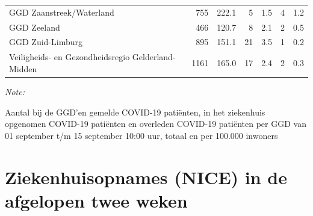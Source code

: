 \documentclass[
  english,
  man,floatsintext]{apa6}
\begin{document}
\begin{table}
\begin{threeparttable}
\begin{tabular}{lrrrrrr}
GGD Zaanstreek/Waterland & 755 & 222.1 & 5 & 1.5 & 4 & 1.2\\
GGD Zeeland & 466 & 120.7 & 8 & 2.1 & 2 & 0.5\\
GGD Zuid-Limburg & 895 & 151.1 & 21 & 3.5 & 1 & 0.2\\
Veiligheids- en Gezondheidsregio Gelderland-Midden & 1161 & 165.0 & 17 & 2.4 & 2 & 0.3\\
\bottomrule
\end{tabular}
\begin{tablenotes}
\item \textit{Note: } 
\item Aantal bij de GGD’en gemelde COVID-19 patiënten, in het ziekenhuis opgenomen COVID-19 patiënten en overleden COVID-19 patiënten per GGD van 01 september t/m 15 september 10:00 uur, totaal en per 100.000 inwoners
\end{tablenotes}
\end{threeparttable}
\endgroup{}
\end{table}

\newpage

\hypertarget{ziekenhuisopnames-nice-in-de-afgelopen-twee-weken}{%
\section{Ziekenhuisopnames (NICE) in de afgelopen twee weken}\label{ziekenhuisopnames-nice-in-de-afgelopen-twee-weken}}
\end{document}
